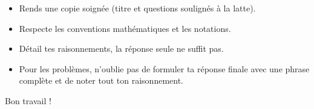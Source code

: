 \documentclass[a4paper, 12pt, parskip=half-, twoside=semi]{scrartcl}
\begin{document}
\pagestyle{empty}
\entete
{}
\begin{itemize}
    \item Rends une copie soignée (titre et questions soulignés à la latte).
    \item Respecte les conventions mathématiques et les notations.
    \item Détail tes raisonnements, la réponse seule ne suffit pas.
    \item Pour les problèmes, n'oublie pas de formuler ta réponse finale  avec une phrase complète et de noter tout ton raisonnement.
\end{itemize}
\vfill
\begin{flushright}
    Bon travail !
\end{flushright}
\cleardoublepage
\pagestyle{plain}
\setcounter{page}{1}
\end{document}

